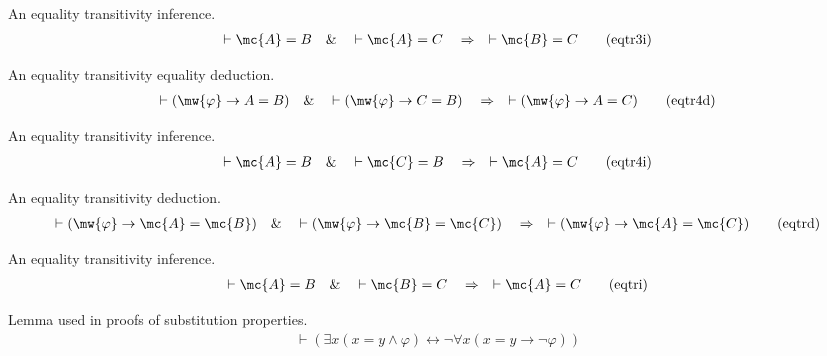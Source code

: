 \begin{lemma} {An equality transitivity inference.} 
\begin{align}
\vdash \mc{A} = B\quad\&\quad \vdash \mc{A} = C\quad\Rightarrow\quad \vdash \mc{B} =
    C\label{eq:eqtr3i}\tag{eqtr3i}
\end{align}
\end{lemma}


\begin{lemma} {An equality transitivity equality deduction.}
\begin{align}
\vdash ( \mw{\varphi} \rightarrow A = B )\quad\&\quad \vdash ( \mw{\varphi}
    \rightarrow C = B )\quad\Rightarrow\quad \vdash ( \mw{\varphi} \rightarrow
    A = C )\label{eq:eqtr4d}\tag{eqtr4d}
\end{align}
\end{lemma}


\begin{lemma} {An equality transitivity inference.} 
\begin{align}
\vdash \mc{A} = B\quad\&\quad \vdash \mc{C} = B\quad\Rightarrow\quad \vdash \mc{A} =
    C\label{eq:eqtr4i}\tag{eqtr4i}
\end{align}
\end{lemma}


\begin{lemma} {An equality transitivity deduction.} 
\begin{align}
\vdash ( \mw{\varphi} \rightarrow \mc{A} = \mc{B} )\quad\&\quad \vdash ( \mw{\varphi}
    \rightarrow \mc{B} = \mc{C} )\quad\Rightarrow\quad \vdash ( \mw{\varphi} \rightarrow
    \mc{A} = \mc{C} )\label{eq:eqtrd}\tag{eqtrd}
\end{align}
\end{lemma}


\begin{lemma} {An equality transitivity inference.} 
\begin{align}
\vdash \mc{A} = B\quad\&\quad \vdash \mc{B} = C\quad\Rightarrow\quad \vdash \mc{A} =
    C\label{eq:eqtri}\tag{eqtri}
\end{align}
\end{lemma}


\begin{lemma} {Lemma used in proofs of substitution
properties.} 
\begin{align}
\vdash ( \exists x ( x = y \wedge \varphi ) \leftrightarrow \lnot \forall x ( x
    = y \rightarrow \lnot \varphi ) )\label{eq:equs3}\tag{equs3}
\end{align}
\end{lemma}


